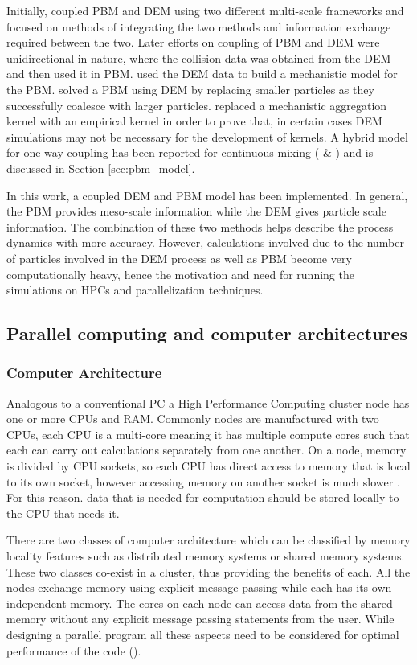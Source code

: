 \documentclass[preprint,11pt,authoryear]{elsarticle}
\begin{document}
Initially, \cite{ingram2005} coupled PBM and DEM using two different multi-scale frameworks and 
focused on methods of integrating the two methods and information exchange required between the 
two. Later efforts on coupling of PBM and DEM were unidirectional in nature, where the collision 
data was obtained from the DEM and then used it in PBM. \cite{gantt2006} used the DEM data 
to build a mechanistic model for the PBM. \cite{Goldschmidt2003} solved a PBM using DEM by 
replacing smaller particles as they successfully coalesce with larger particles. 
\cite{Reinhold2012} replaced a mechanistic aggregation kernel with an empirical kernel 
in order to prove that, in certain cases DEM simulations may not be necessary for the 
development of kernels. A hybrid model for one-way coupling has been reported for continuous mixing (\cite{sen2013} \&  
\cite{sen2013b}) and is discussed in Section \ref{sec:pbm_model}.

In this work, a coupled DEM and PBM model has been implemented. In general, the PBM provides meso-scale 
information while the DEM gives particle scale information. The combination of these two methods helps 
describe the process dynamics with more accuracy. However, calculations involved due to the number 
of particles involved in the DEM process as well as PBM become very computationally heavy, hence the
motivation and need for running the simulations on HPCs and parallelization techniques. 
 

\subsection{Parallel computing and computer architectures}
\subsubsection{Computer Architecture}
Analogous to a conventional PC a High Performance Computing cluster node has one
or more CPUs and RAM. Commonly nodes are manufactured with two CPUs, each CPU 
is a multi-core meaning it has multiple compute cores such that each can carry out calculations 
separately from one another. On a node, memory is divided by CPU sockets, so each CPU has direct 
access to memory that is local to its own socket, however accessing memory on another socket 
is much slower \cite{Jin2011}. For this reason. data that is needed for computation should 
be stored locally to the CPU that needs it.  

There are two classes of computer architecture which can be classified by memory locality features such as 
distributed memory systems or shared memory systems. These two classes co-exist in a cluster, 
thus providing the benefits of each. All the nodes exchange memory using explicit message passing 
while each has its own independent memory. The cores on each node can access data from the 
shared memory without any explicit message passing statements from the user. While designing a 
parallel program all these aspects need to be considered for optimal performance of the code 
(\cite{Adhianto2007}).
\end{document}
